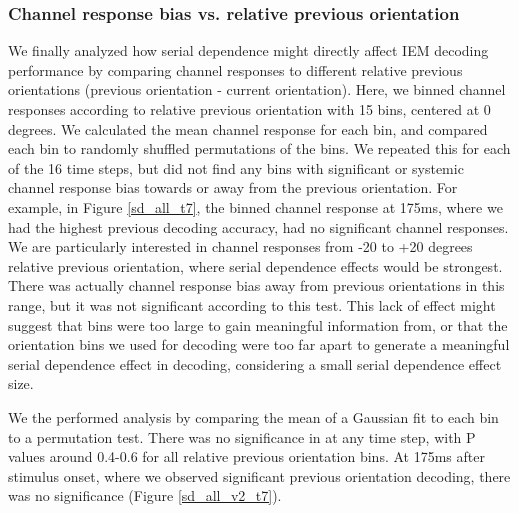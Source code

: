 \documentclass[../main.tex]{subfiles}
\begin{document}
\subsubsection{Channel response bias vs. relative previous orientation}
We finally analyzed how serial dependence might directly affect IEM decoding performance by comparing channel responses to different relative previous orientations (previous orientation - current orientation). Here, we binned channel responses according to relative previous orientation with 15 bins, centered at 0 degrees. We calculated the mean channel response for each bin, and compared each bin to randomly shuffled permutations of the bins. We repeated this for each of the 16 time steps, but did not find any bins with significant or systemic channel response bias towards or away from the previous orientation. For example, in Figure \ref{sd_all_t7}, the binned channel response at 175ms, where we had the highest previous decoding accuracy, had no significant channel responses. We are particularly interested in channel responses from -20 to +20 degrees relative previous orientation, where serial dependence effects would be strongest. There was actually channel response bias away from previous orientations in this range, but it was not significant according to this test. This lack of effect might suggest that bins were too large to gain meaningful information from, or that the orientation bins we used for decoding were too far apart to generate a meaningful serial dependence effect in decoding, considering a small serial dependence effect size.

We the performed analysis by comparing the mean of a Gaussian fit to each bin to a permutation test. There was no significance in at any time step, with P values around 0.4-0.6 for all relative previous orientation bins. At 175ms after stimulus onset, where we observed significant previous orientation decoding, there was no significance (Figure \ref{sd_all_v2_t7}).
\end{document}

